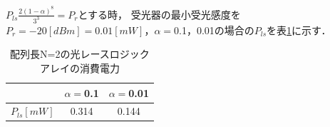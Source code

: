 $P_{ls}\frac{2(1-\alpha)^8}{3^3} = P_{r}$とする時，
受光器の最小受光感度を$P_{r}=-20[dBm]=0.01[mW]$，$\alpha = $0.1，0.01の場合の$P_{ls}$を表\ref{pls}に示す．
\begin{table}[t!]
\begin{center}
\caption{配列長N=2の光レースロジックアレイの消費電力}
\begin{tabular}{|c|c|c|} \hline
&$\alpha = $0.1&$\alpha = $0.01\\ \hline \hline
$P_{ls}[mW]$&0.314&0.144\\ \hline
\end{tabular}
\label{pls}
\end{center}
\end{table}
